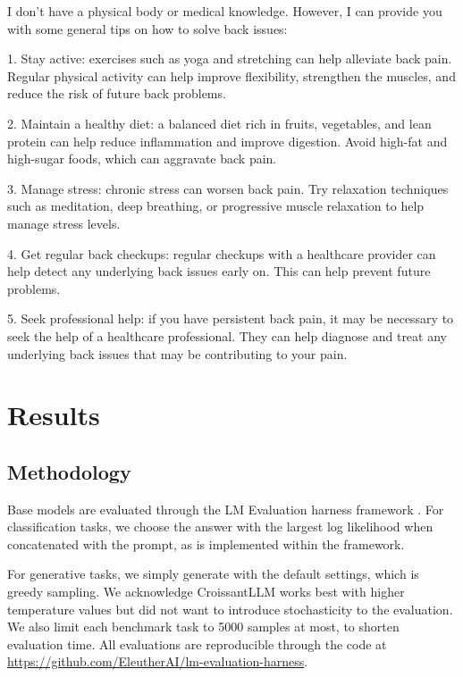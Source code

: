 \begin{completionkaobox}[frametitle=CroissantLLMChat]
I don't have a physical body or medical knowledge. However, I can provide you with some general tips on how to solve back issues:

1. Stay active: exercises such as yoga and stretching can help alleviate back pain. Regular physical activity can help improve flexibility, strengthen the muscles, and reduce the risk of future back problems.

2. Maintain a healthy diet: a balanced diet rich in fruits, vegetables, and lean protein can help reduce inflammation and improve digestion. Avoid high-fat and high-sugar foods, which can aggravate back pain.

3. Manage stress: chronic stress can worsen back pain. Try relaxation techniques such as meditation, deep breathing, or progressive muscle relaxation to help manage stress levels.

4. Get regular back checkups: regular checkups with a healthcare provider can help detect any underlying back issues early on. This can help prevent future problems.

5. Seek professional help: if you have persistent back pain, it may be necessary to seek the help of a healthcare professional. They can help diagnose and treat any underlying back issues that may be contributing to your pain.
\end{completionkaobox}

\section{Results}
\subsection{Methodology}
Base models are evaluated through the LM Evaluation harness framework . For classification tasks, we choose the answer with the largest log likelihood when concatenated with the prompt, as is implemented within the framework.

For generative tasks, we simply generate with the default settings, which is greedy sampling. We acknowledge CroissantLLM works best with higher temperature values but did not want to introduce stochasticity to the evaluation. We also limit each benchmark task to 5000 samples at most, to shorten evaluation time. All evaluations are reproducible through the code at \url{https://github.com/EleutherAI/lm-evaluation-harness}.


